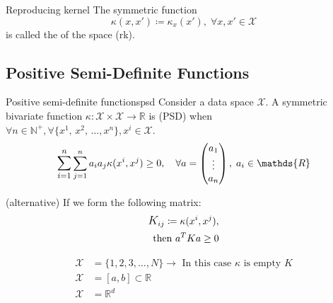 \begin{definition}{Reproducing kernel}{}
	The symmetric function
	\begin{equation*}
		\kappa(x, x') \coloneqq \kappa_x(x'),\; \forall x, x' \in \mathcal{X}
	\end{equation*}
	is called the  of the space (rk).
\end{definition}

\subsection{Positive Semi-Definite Functions}

\begin{definition}{Positive semi-definite functions}{psd}
	Consider a data space $\mathcal{X}$. A symmetric bivariate function
	$\kappa: \mathcal{X} \times \mathcal{X} \to \mathds{R}$ is
	 (PSD) when
	$\forall n \in \mathds{N}^+, \forall \{x^1,\, x^2,\,\dots, x^n\},
		x^i \in \mathcal{X}$.
	\begin{align*}
		\mathlarger{\sum_{i=1}^n} \sum_{j=1}^n  a_i a_j \kappa(x^i, x^j) \geq 0,\quad
		\forall a=\begin{pmatrix} a_1 \\ \vdots \\ a_n \end{pmatrix},\; a_i \in \mathds{R}
	\end{align*}

	\tcblower

	(alternative) If we form the following matrix:
	\begin{align*}
		\mathlarger{K}_{ij} \coloneqq \kappa(x^i, x^j), \\ \text{ then } a^TKa \geq 0
	\end{align*}
\end{definition}

\begin{example}{}{}
	\begin{align*}
		\mathcal{X} & = \{1, 2, 3, \dots, N \} \rightarrow{}
		\text{ In this case } \kappa \text{ is empty } K     \\
		\mathcal{X} & = [a,b] \subset \mathds{R}             \\
		\mathcal{X} & = \mathds{R}^d
	\end{align*}
\end{example}

